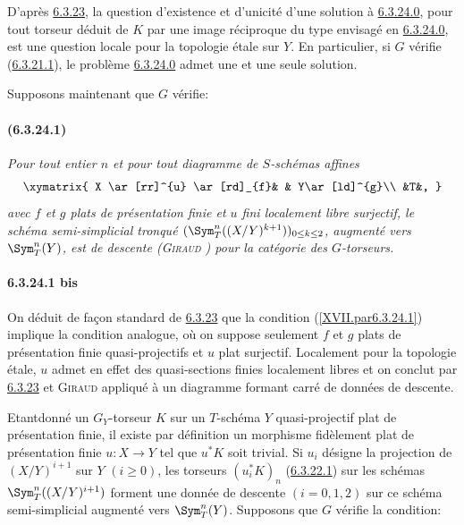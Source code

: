 D'après \hyperref[XVII.prop6.3.23]{6.3.23}, la question d'existence et d'unicité d'une solution à
\hyperref[XVII.par6.3.24.0]{6.3.24.0}, pour tout torseur déduit de $K$ par une image réciproque du
type envisagé en \hyperref[XVII.par6.3.24.0]{6.3.24.0}, est une question locale pour la topologie
étale sur $Y$. En particulier, si $G$ vérifie (\hyperref[XVII.par6.3.21.1]{6.3.21.1}), le problème
\hyperref[XVII.par6.3.24.0]{6.3.24.0} admet une et une seule solution.

Supposons maintenant que $G$ vérifie:

\paragraph*{(6.3.24.1)}\label{XVII.par6.3.24.1}
\emph{Pour tout entier $n$ et pour tout diagramme de $S$-schémas
affines
\[
\xymatrix{
X \ar[rr]^{u} \ar[rd]_{f}& & Y\ar[ld]^{g}\\
  &T&,
}
\]
avec $f$ et $g$ plats de présentation finie et $u$ fini
localement libre surjectif, le schéma semi-simplicial tronqué
$(\Sym^{n}_{T}((X/Y)^{k+1}))_{0\leq k\leq 2}$, augmenté vers
$\Sym^{n}_{T}(Y)$, est de descente \emph{(\textsc{Giraud} \cite{Gi})} pour la
catégorie des $G$-torseurs.}

\paragraph*{6.3.24.1 bis}
On déduit de façon standard de \hyperref[XVII.prop6.3.23]{6.3.23} que la
condition  (\ref{XVII.par6.3.24.1})
implique la condition analogue, où on suppose seulement $f$ et $g$
plats de présentation finie quasi-projectifs et $u$ plat
surjectif. Localement pour la topologie étale, $u$ admet en effet des
quasi-sections finies localement libres et on conclut par \hyperref[XVII.prop6.3.23]{6.3.23} et
\textsc{Giraud} \cite{Gi} appliqué à un diagramme formant carré de données de descente.

Etant\pageoriginale donné un $G_{Y}$-torseur $K$ sur un $T$-schéma $Y$
quasi-projectif plat de présentation finie, il existe par définition
un morphisme fidèlement plat de présentation finie $u:X\rightarrow Y$
tel que $u^{\ast}K$ soit trivial. Si $u_{i}$ désigne la projection de
$(X/Y)^{i+1}$ sur $Y$ $(i\geq 0)$, les torseurs $(u^{\ast}_{i}K)_{n}$
(\hyperref[XVII.lem6.3.22.1]{6.3.22.1}) sur les schémas $\Sym^{n}_{T}((X/Y)^{i+1})$ forment une
donnée de descente $(i=0,1,2)$ sur ce schéma semi-simplicial augmenté
vers $\Sym^{n}_{T}(Y)$. Supposons que $G$ vérifie la condition:

